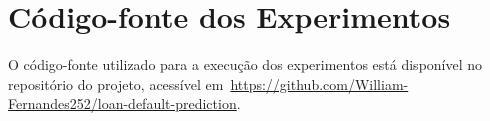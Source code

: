 \section{Código-fonte dos Experimentos}

O código-fonte utilizado para a execução dos experimentos está disponível no repositório do projeto, acessível em~\url{https://github.com/William-Fernandes252/loan-default-prediction}.